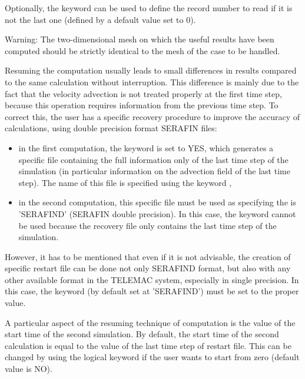 Optionally, the keyword  can be used to
define the record number to read if it is not the last one (defined by a
default value set to 0).

\begin{WarningBlock}{Warning:}
The two-dimensional mesh on which the useful results have been computed should
be strictly identical to the mesh of the case to be handled.
\end{WarningBlock}

Resuming the computation usually leads to small differences in results
compared to the same calculation without interruption. This difference is
mainly due to the fact that the velocity advection is not treated properly at
the first time step, because this operation requires information from the
previous time step. To correct this, the user has a specific recovery procedure
to improve the accuracy of calculations, using double precision format SERAFIN
files:

\begin{itemize}
\item in the first computation, the keyword  is set to
YES, which generates a specific file containing the full information only of
the last time step of the simulation (in particular information on the
advection field of the last time step). The name of this file is specified
using the keyword ,

\item in the second computation, this specific file must be used as
 specifying the  is 'SERAFIND' (SERAFIN double precision). In this case, the
keyword  cannot be used because the recovery
file only contains the last time step of the simulation.
\end{itemize}

However, it has to be mentioned that even if it is not advisable, the creation
of specific restart file can be done not only SERAFIND format, but also with
any other available format in the TELEMAC system, especially in single
precision. In this case, the keyword  (by default
set at 'SERAFIND') must be set to the proper value.

A particular aspect of the resuming technique of computation is the value of
the start time of the second simulation. By default, the start time of the
second calculation is equal to the value of the last time step of restart file.
This can be changed by using the logical keyword  if the user wants to start from zero (default value is NO).

